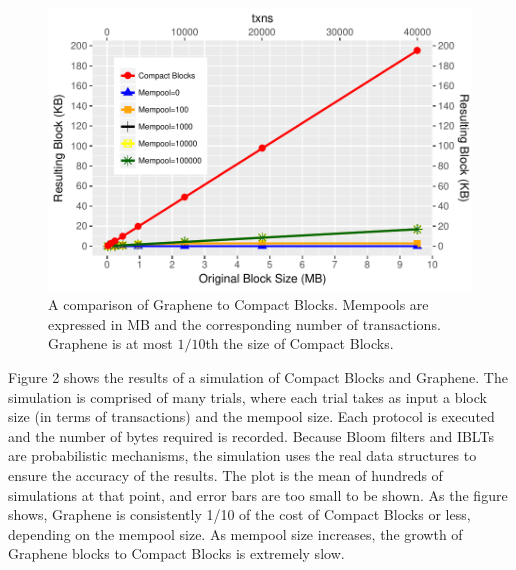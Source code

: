 \begin{figure}\begin{center}
	\includegraphics[width=1\textwidth]{graphs/graphene}
	\caption{A comparison of Graphene to Compact Blocks.
Mempools are expressed in MB and the corresponding number of transactions. Graphene is at most $1/10$th the size of Compact Blocks.  
	\label{fig:graphene}}
\end{center}\end{figure}

Figure 2 shows the results of a simulation of
Compact Blocks and Graphene. The simulation is comprised
of many trials, where each trial takes as input a block size (in terms
of transactions) and the mempool size. Each protocol is executed and the
number of bytes required is recorded. Because Bloom filters
and IBLTs are probabilistic mechanisms, the simulation uses
the real data structures to ensure the accuracy of the results.
The plot is the mean of hundreds of simulations
at that point, and error bars are too small to be shown.
As the figure shows, Graphene is consistently 1/10 of the
cost of Compact Blocks or less, depending on the mempool
size. As mempool size increases, the growth of Graphene blocks to Compact Blocks is extremely slow.

